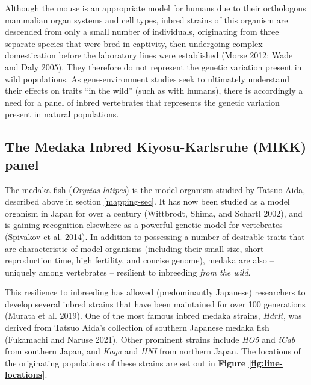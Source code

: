 \documentclass[
]{book}
\begin{document}
Although the mouse is an appropriate model for humans due to their orthologous mammalian organ systems and cell types, inbred strains of this organism are descended from only a small number of individuals, originating from three separate species that were bred in captivity, then undergoing complex domestication before the laboratory lines were established (Morse 2012; Wade and Daly 2005). They therefore do not represent the genetic variation present in wild populations. As gene-environment studies seek to ultimately understand their effects on traits ``in the wild'' (such as with humans), there is accordingly a need for a panel of inbred vertebrates that represents the genetic variation present in natural populations.

\hypertarget{MIKK-background}{%
\subsection{The Medaka Inbred Kiyosu-Karlsruhe (MIKK) panel}\label{MIKK-background}}

The medaka fish (\emph{Oryzias latipes}) is the model organism studied by Tatsuo Aida, described above in section \ref{mapping-sec}. It has now been studied as a model organism in Japan for over a century (Wittbrodt, Shima, and Schartl 2002), and is gaining recognition elsewhere as a powerful genetic model for vertebrates (Spivakov et al. 2014). In addition to possessing a number of desirable traits that are characteristic of model organisms (including their small-size, short reproduction time, high fertility, and concise genome), medaka are also -- uniquely among vertebrates -- resilient to inbreeding \emph{from the wild}.

This resilience to inbreeding has allowed (predominantly Japanese) researchers to develop several inbred strains that have been maintained for over 100 generations (Murata et al. 2019). One of the most famous inbred medaka strains, \emph{HdrR}, was derived from Tatsuo Aida's collection of southern Japanese medaka fish (Fukamachi and Naruse 2021). Other prominent strains include \emph{HO5} and \emph{iCab} from southern Japan, and \emph{Kaga} and \emph{HNI} from northern Japan. The locations of the originating populations of these strains are set out in \textbf{Figure \ref{fig:line-locations}}.
\end{document}

